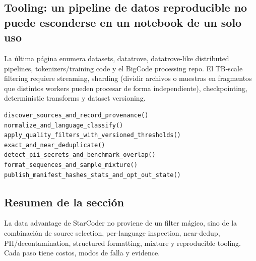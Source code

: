 \subsection{Tooling: un pipeline de datos reproducible no puede esconderse en un notebook de un solo uso}

La última página enumera datasets, datatrove, datatrove-like distributed pipelines, tokenizers/training code y el BigCode processing repo. El TB-scale filtering requiere streaming, sharding (dividir archivos o muestras en fragmentos que distintos workers pueden procesar de forma independiente), checkpointing, deterministic transforms y dataset versioning.


\begin{lstlisting}[caption={Contrato por etapas de un pipeline de datos reproducible}]
discover_sources_and_record_provenance()
normalize_and_language_classify()
apply_quality_filters_with_versioned_thresholds()
exact_and_near_deduplicate()
detect_pii_secrets_and_benchmark_overlap()
format_sequences_and_sample_mixture()
publish_manifest_hashes_stats_and_opt_out_state()
\end{lstlisting}

\subsection{Resumen de la sección}

La data advantage de StarCoder no proviene de un filter mágico, sino de la combinación de source selection, per-language inspection, near-dedup, PII/decontamination, structured formatting, mixture y reproducible tooling. Cada paso tiene costos, modos de falla y evidence.

